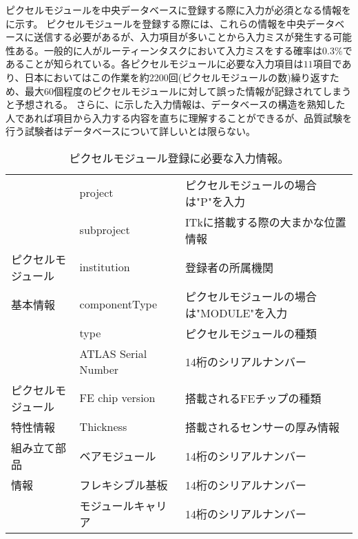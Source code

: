 ピクセルモジュールを中央データベースに登録する際に入力が必須となる情報をに示す。
ピクセルモジュールを登録する際には、これらの情報を中央データベースに送信する必要があるが、入力項目が多いことから入力ミスが発生する可能性ある。一般的に人がルーティーンタスクにおいて入力ミスをする確率は$0.3\%$であることが知られている\cite{human}。各ピクセルモジュールに必要な入力項目は$11$項目であり、日本においてはこの作業を約$2200$回(ピクセルモジュールの数)繰り返すため、最大$60$個程度のピクセルモジュールに対して誤った情報が記録されてしまうと予想される。
さらに、に示した入力情報は、データベースの構造を熟知した人であれば項目から入力する内容を直ちに理解することができるが、品質試験を行う試験者はデータベースについて詳しいとは限らない。

\begin{table}[tbp]
  \begin{center}
    \caption[ピクセルモジュール登録に必要な入力情報]{ピクセルモジュール登録に必要な入力情報。}
    \label{tab:nyuuryoku}
    \begin{tabular}{|l||l|l|}
    \hline
    & project &  ピクセルモジュールの場合は"P"を入力 \\
    \cline{2-3}
    & subproject & ITkに搭載する際の大まかな位置情報 \\
    \cline{2-3}
    ピクセルモジュール
    & institution & 登録者の所属機関 \\
    \cline{2-3}
    基本情報
    & componentType & ピクセルモジュールの場合は"MODULE"を入力 \\
    \cline{2-3}
    & type & ピクセルモジュールの種類 \\
    \cline{2-3}
    & ATLAS Serial Number & 14桁のシリアルナンバー \\
    \hline
    ピクセルモジュール
    & FE chip version & 搭載されるFEチップの種類 \\
    \cline{2-3}
    特性情報 & Thickness & 搭載されるセンサーの厚み情報 \\
    \hline
    組み立て部品 & ベアモジュール & 14桁のシリアルナンバー \\
    \cline{2-3}
    情報 & フレキシブル基板 & 14桁のシリアルナンバー \\
    \cline{2-3}
     & モジュールキャリア & 14桁のシリアルナンバー \\
    \hline
    \end{tabular}
  \end{center}
\end{table}

